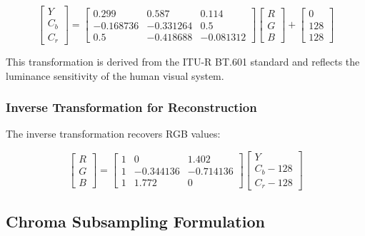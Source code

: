 \documentclass[11pt,a4paper]{article}
\begin{document}
\begin{equation}
\begin{bmatrix} Y \\ C_b \\ C_r \end{bmatrix} = \begin{bmatrix} 0.299 & 0.587 & 0.114 \\ -0.168736 & -0.331264 & 0.5 \\ 0.5 & -0.418688 & -0.081312 \end{bmatrix} \begin{bmatrix} R \\ G \\ B \end{bmatrix} + \begin{bmatrix} 0 \\ 128 \\ 128 \end{bmatrix}
\label{eq:rgb_to_ycbcr}
\end{equation}

This transformation is derived from the ITU-R BT.601 standard and reflects the luminance sensitivity of the human visual system.

\subsubsection{Inverse Transformation for Reconstruction}

The inverse transformation recovers RGB values:

\begin{equation}
\begin{bmatrix} R \\ G \\ B \end{bmatrix} = \begin{bmatrix} 1 & 0 & 1.402 \\ 1 & -0.344136 & -0.714136 \\ 1 & 1.772 & 0 \end{bmatrix} \begin{bmatrix} Y \\ C_b - 128 \\ C_r - 128 \end{bmatrix}
\label{eq:ycbcr_to_rgb}
\end{equation}

\subsection{Chroma Subsampling Formulation}
\end{document}
